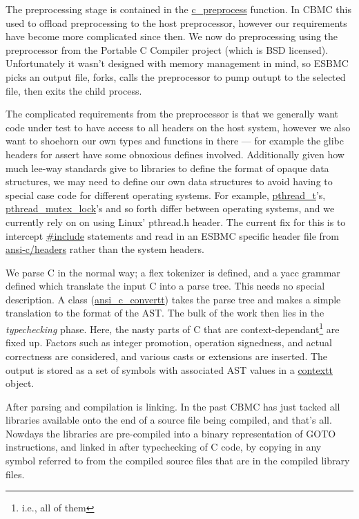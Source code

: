 \documentclass{article}
\begin{document}
The preprocessing stage is contained in the \url{c_preprocess} function.
In CBMC this used to offload preprocessing to the host preprocessor, however
our requirements have become more complicated since then. We now do
preprocessing using the preprocessor from the Portable C Compiler project
(which is BSD licensed). Unfortunately it wasn't designed with memory management
in mind, so ESBMC picks an output file, forks, calls the preprocessor to pump
outupt to the selected file, then exits the child process.

The complicated requirements from the preprocessor is that we generally want
code under test to have access to all headers on the host system, however we
also want to shoehorn our own types and functions in there --- for example the
glibc headers for assert have some obnoxious defines involved. Additionally
given how much lee-way standards give to libraries to define the format of
opaque data structures, we may need to define our own data structures to
avoid having to special case code for different operating systems. For example,
\url{pthread_t}'s, \url{pthread_mutex_lock}'s and so forth differ
between operating systems, and we currently rely on on using Linux' pthread.h
header. The current fix for this is to intercept \url{\#include} statements
and read in an ESBMC specific header file from \url{ansi-c/headers} rather
than the system headers.

We parse C in the normal way; a flex tokenizer is defined, and a yacc grammar
defined which translate the input C into a parse tree. This needs no special
description. A class (\url{ansi_c_convertt}) takes the parse tree and
makes a simple translation to the format of the AST. The bulk of the work then
lies in the \textit{typechecking} phase. Here, the nasty parts of C that are
context-dependant\footnote{i.e., all of them} are fixed up. Factors such as
integer promotion, operation signedness, and actual correctness are
considered, and various casts or extensions are inserted. The output is stored
as a set of symbols with associated AST values in a \url{contextt} object.

After parsing and compilation is linking. In the past CBMC has just
tacked all libraries available onto the end of a source file being compiled,
and that's all. Nowdays the libraries are pre-compiled into a binary
representation of GOTO instructions, and linked in after typechecking of C
code, by copying in any symbol referred to from the compiled source files
that are in the compiled library files.
\end{document}
